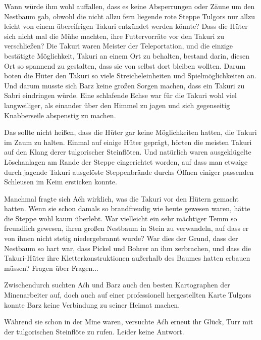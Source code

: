 Wann würde ihm wohl auffallen, dass es keine Absperrungen oder Zäune um den Nestbaum gab, obwohl die nicht allzu fern liegende rote Steppe Tulgors nur allzu leicht von einem übereifrigen Takuri entzündet werden könnte? Dass die Hüter sich nicht mal die Mühe machten, ihre Futtervorräte vor den Takuri zu verschließen? Die Takuri waren Meister der Teleportation, und die einzige bestätigte Möglichkeit, Takuri an einem Ort zu behalten, bestand darin, diesen Ort so spannend zu gestalten, dass sie von selbst dort bleiben wollten. Darum boten die Hüter den Takuri so viele Streicheleinheiten und Spielmöglichkeiten an. Und darum musste sich Barz keine großen Sorgen machen, dass ein Takuri zu Sabri eindringen würde. Eine schlafende Echse war für die Takuri wohl viel langweiliger, als einander über den Himmel zu jagen und sich gegenseitig Knabberseile abspenstig zu machen.

Das sollte nicht heißen, dass die Hüter gar keine Möglichkeiten hatten, die Takuri im Zaum zu halten. Einmal auf einige Hüter geprägt, hörten die meisten Takuri auf den Klang derer tulgorischer Steinflöten. Und natürlich waren ausgeklügelte Löschanlagen am Rande der Steppe eingerichtet worden, auf dass man etwaige durch jagende Takuri ausgelöste Steppenbrände durchs Öffnen einiger passenden Schleusen im Keim ersticken konnte.

Manchmal fragte sich Aćh wirklich, was die Takuri vor den Hütern gemacht hatten. Wenn sie schon damals so brandfreudig wie heute gewesen waren, hätte die Steppe wohl kaum überlebt. War vielleicht ein sehr mächtiger Temm so freundlich gewesen, ihren großen Nestbaum in Stein zu verwandeln, auf dass er von ihnen nicht stetig niedergebrannt wurde? War dies der Grund, dass der Nestbaum so hart war, dass Pickel und Bohrer an ihm zerbrachen, und dass die Takuri-Hüter ihre Kletterkonstruktionen außerhalb des Baumes hatten erbauen müssen? Fragen über Fragen...\bigskip






Zwischendurch suchten Aćh und Barz auch den besten Kartographen der Minenarbeiter auf, doch auch auf einer professionell hergestellten Karte Tulgors konnte Barz keine Verbindung zu seiner Heimat machen.

Während sie schon in der Mine waren, versuchte Aćh erneut ihr Glück, Turr mit der tulgorischen Steinflöte zu rufen. Leider keine Antwort.\bigskip







